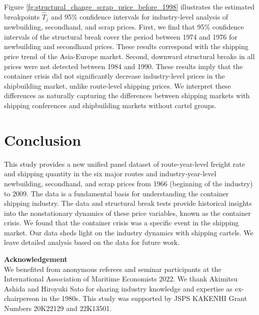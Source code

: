 \documentclass[11pt]{article}
\begin{document}
Figure \ref{fg:structural_change_scrap_price_before_1998} illustrates the estimated breakpoints $\hat{T}_j$ and 95\% confidence intervals for industry-level analysis of newbuilding, secondhand, and scrap prices. First, we find that 95\% confidence intervals of the structural break cover the period between 1974 and 1976 for newbuilding and secondhand prices. These results correspond with the shipping price trend of the Asia-Europe market. Second, downward structural breaks in all prices were not detected between 1984 and 1990. These results imply that the container crisis did not significantly decrease industry-level prices in the shipbuilding market, unlike route-level shipping prices. We interpret these differences as naturally capturing the differences between shipping markets with shipping conferences and shipbuilding markets without cartel groups.


\section{Conclusion}\label{sec:conclusion}
This study provides a new unified panel dataset of route-year-level freight rate and shipping quantity in the six major routes and industry-year-level newbuilding, secondhand, and scrap prices from 1966 (beginning of the industry) to 2009. The data is a fundamental basis for understanding the container shipping industry. The data and structural break tests provide historical insights into the nonstationary dynamics of these price variables, known as the container crisis. We found that the container crisis was a specific event in the shipping market. Our data sheds light on the industry dynamics with shipping cartels. We leave detailed analysis based on the data for future work. 

\textbf{Acknowledgement} \\
We benefited from anonymous referees and seminar participants at the International Association of Maritime Economists 2022. We thank Akimitsu Ashida and Hiroyuki Sato for sharing industry knowledge and expertise as ex-chairperson in the 1980s. This study was supported by JSPS KAKENHI Grant Numbers 20K22129 and 22K13501. 





\appendix

% 
% 
\end{document}
